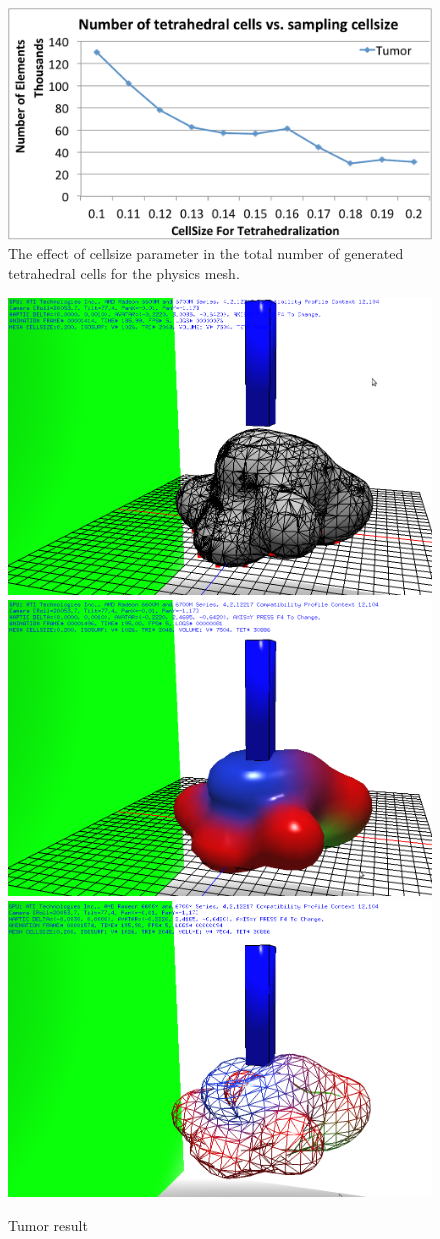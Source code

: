 \begin{figure}[H]
  \centering
  \includegraphics[width=0.8 \linewidth]{figures/deformable/cellsize_elements.pdf}
  \caption{\label{fig:cellsize_elements}
  {The effect of cellsize parameter in the total number of generated tetrahedral cells for the physics mesh.}
}
\end{figure}

\begin{figure}[H]
  \centering
  \includegraphics[width=0.30\linewidth]{figures/deformable/shots/tumor01.png}
  \includegraphics[width=0.30\linewidth]{figures/deformable/shots/tumor02.png}
  \includegraphics[width=0.30\linewidth]{figures/deformable/shots/tumor03.png}
 
  \caption{\label{fig:tumor}
  {Tumor result}
}
\end{figure}

